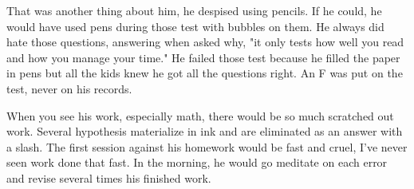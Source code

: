     That was another thing about him, he despised using pencils. If he could, he would have used pens during those test
with bubbles on them. He always did hate those questions, answering when asked why, "it only tests how well you read
and how you manage your time." He failed those test because he filled the paper in pens but all the kids knew he got
all the questions right. An F was put on the test, never on his records.

    When you see his work, especially math, there would be so much scratched out work. Several hypothesis materialize
in ink and are eliminated as an answer with a slash. The first session against his homework would be fast and cruel,
I've never seen work done that fast. In the morning, he would go meditate on each error and revise several times his
finished work.
